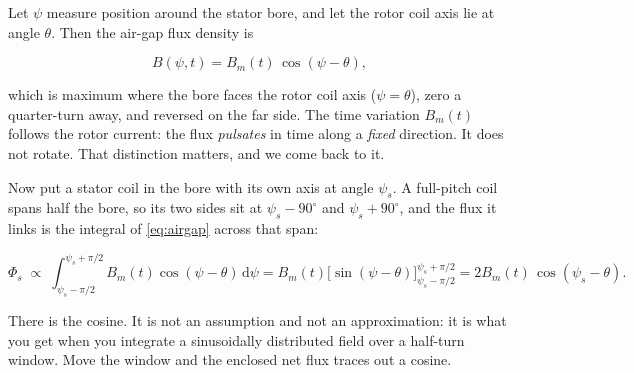 \documentclass[11pt,a4paper]{article}
\begin{document}
Let $\psi$ measure position around the stator bore, and let the rotor coil
axis lie at angle $\theta$. Then the air-gap flux density is

\begin{equation}
  B(\psi,t)=B_{m}(t)\,\cos(\psi-\theta),
  \label{eq:airgap}
\end{equation}

which is maximum where the bore faces the rotor coil axis ($\psi=\theta$),
zero a quarter-turn away, and reversed on the far side. The time variation
$B_{m}(t)$ follows the rotor current: the flux \emph{pulsates} in time along
a \emph{fixed} direction. It does not rotate. That distinction matters, and
we come back to it.

Now put a stator coil in the bore with its own axis at angle $\psi_{s}$. A
full-pitch coil spans half the bore, so its two sides sit at
$\psi_{s}-90^\circ$ and $\psi_{s}+90^\circ$, and the flux it links is the
integral of \eqref{eq:airgap} across that span:

\begin{equation}
  \Phi_{s}\;\propto\;\int_{\psi_{s}-\pi/2}^{\psi_{s}+\pi/2}
     B_{m}(t)\cos(\psi-\theta)\,\mathrm{d}\psi
   = B_{m}(t)\Big[\sin(\psi-\theta)\Big]_{\psi_{s}-\pi/2}^{\psi_{s}+\pi/2}
   = 2B_{m}(t)\,\cos(\psi_{s}-\theta).
  \label{eq:fluxlink}
\end{equation}

There is the cosine. It is not an assumption and not an approximation: it is
what you get when you integrate a sinusoidally distributed field over a
half-turn window. Move the window and the enclosed net flux traces out a
cosine.
\end{document}
